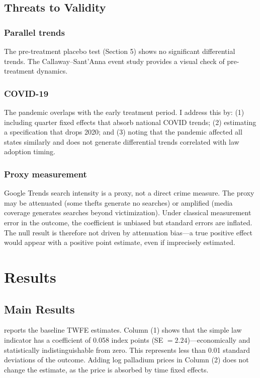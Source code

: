 \documentclass[12pt]{article}
\begin{document}
\subsection{Threats to Validity}

\subsubsection*{Parallel trends} The pre-treatment placebo test (Section 5) shows no significant differential trends. The Callaway--Sant'Anna event study provides a visual check of pre-treatment dynamics.

\subsubsection*{COVID-19} The pandemic overlaps with the early treatment period. I address this by: (1) including quarter fixed effects that absorb national COVID trends; (2) estimating a specification that drops 2020; and (3) noting that the pandemic affected all states similarly and does not generate differential trends correlated with law adoption timing.

\subsubsection*{Proxy measurement} Google Trends search intensity is a proxy, not a direct crime measure. The proxy may be attenuated (some thefts generate no searches) or amplified (media coverage generates searches beyond victimization). Under classical measurement error in the outcome, the coefficient is unbiased but standard errors are inflated. The null result is therefore not driven by attenuation bias---a true positive effect would appear with a positive point estimate, even if imprecisely estimated.

\section{Results}

\subsection{Main Results}



 reports the baseline TWFE estimates. Column (1) shows that the simple law indicator has a coefficient of 0.058 index points (SE $= 2.24$)---economically and statistically indistinguishable from zero. This represents less than 0.01 standard deviations of the outcome. Adding log palladium prices in Column (2) does not change the estimate, as the price is absorbed by time fixed effects.
\end{document}
